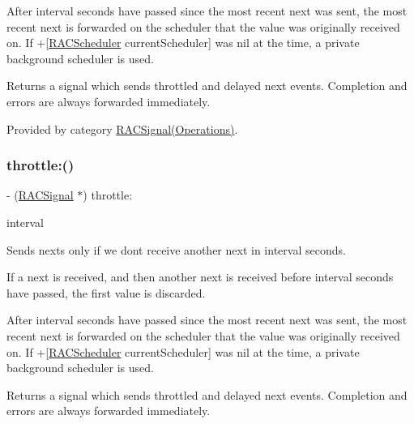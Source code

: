 After {\ttfamily interval} seconds have passed since the most recent {\ttfamily next} was sent, the most recent {\ttfamily next} is forwarded on the scheduler that the value was originally received on. If +\mbox{[}\mbox{\hyperlink{interface_r_a_c_scheduler}{R\+A\+C\+Scheduler}} current\+Scheduler\mbox{]} was nil at the time, a private background scheduler is used.

Returns a signal which sends throttled and delayed {\ttfamily next} events. Completion and errors are always forwarded immediately. 

Provided by category \mbox{\hyperlink{category_r_a_c_signal_07_operations_08_a2542ae804d05ec734d0f4d2fa8c3ac93}{R\+A\+C\+Signal(\+Operations)}}.

\mbox{\label{interface_r_a_c_signal_a2542ae804d05ec734d0f4d2fa8c3ac93}} 
\subsubsection{\texorpdfstring{throttle\+:()}{throttle:()}\hspace{0.1cm}{\footnotesize\ttfamily [2/3]}}
{\footnotesize\ttfamily -\/ (\mbox{\hyperlink{interface_r_a_c_signal}{R\+A\+C\+Signal}} $\ast$) throttle\+: \begin{DoxyParamCaption}\item[{(N\+S\+Time\+Interval)}]{interval }\end{DoxyParamCaption}}

Sends {\ttfamily next}s only if we don\textquotesingle{}t receive another {\ttfamily next} in {\ttfamily interval} seconds.

If a {\ttfamily next} is received, and then another {\ttfamily next} is received before {\ttfamily interval} seconds have passed, the first value is discarded.

After {\ttfamily interval} seconds have passed since the most recent {\ttfamily next} was sent, the most recent {\ttfamily next} is forwarded on the scheduler that the value was originally received on. If +\mbox{[}\mbox{\hyperlink{interface_r_a_c_scheduler}{R\+A\+C\+Scheduler}} current\+Scheduler\mbox{]} was nil at the time, a private background scheduler is used.

Returns a signal which sends throttled and delayed {\ttfamily next} events. Completion and errors are always forwarded immediately. 

